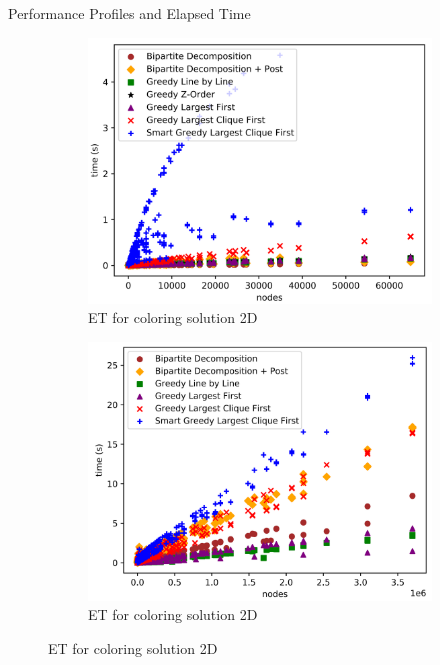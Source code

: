 \begin{frame}{Performance Profiles and Elapsed Time}
\begin{figure}
    \begin{subfigure}{0.4\textwidth}
      \includegraphics[width=\linewidth]{figures/time_results_2D.png}
      \caption{ET for coloring solution 2D}
    \end{subfigure}
    \hfill
    \begin{subfigure}{0.4\textwidth}
      \includegraphics[width=\linewidth]{figures/time_results_3D.png}
      \caption{ET for coloring solution 2D}
    \end{subfigure}
  \end{figure}

\end{frame}